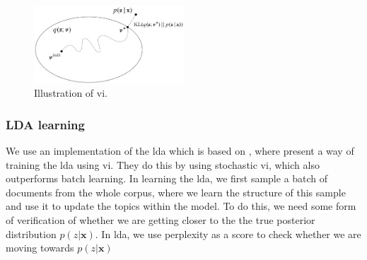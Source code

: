 \begin{figure}
	\centering
	\includegraphics[width=0.5\textwidth]{figures/vi_illustration.png}
	\caption[Caption for LOF]{Illustration of \acrlong{vi}\footnotemark.}
	\label{fig:vi}
\end{figure}

\subsubsection*{LDA learning}
We use an implementation of the \gls{lda} which is based on \cite{blei2010online}, where \citeauthor{blei2010online} present a way of training the \gls{lda} using \gls{vi}.
They do this by using stochastic \gls{vi}, which also outperforms batch learning.
In learning the \gls{lda}, we first sample a batch of documents from the whole corpus, where we learn the structure of this sample and use it to update the topics within the model.
To do this, we need some form of verification of whether we are getting closer to the the true posterior distribution $p(z|\textbf{x})$.
In \gls{lda}, we use perplexity as a score to check whether we are moving towards $p(z|\textbf{x})$
